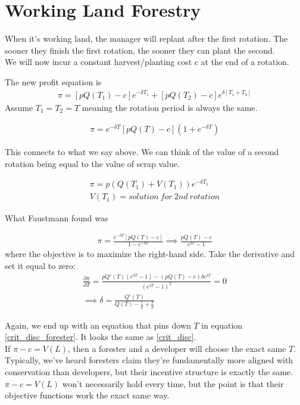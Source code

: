 \documentclass[12pt]{article}
\begin{document}
\section{Working Land Forestry}
When it's working land, the manager will replant after the first rotation. The sooner they finish the first rotation, the sooner they can plant the second. \\

We will now incur a constant  harvest/planting cost $c$ at the end of a rotation. 

The new profit equation is 
\begin{align}
    \pi = [pQ(T_1) - c]e^{-\delta T_1} + [pQ(T_2) - c]e^{\delta [T_1 + T_2]}
\end{align}
Assume $T_1 = T_2 = T$ meaning the rotation period is always the same. 

\begin{align}
    \pi = e^{-\delta T} [pQ(T) - c](1+ e^{-\delta T})
\end{align}

This connects to what we say above. We can think of the value of a second rotation being equal to the value of scrap value. 

\begin{align}
    \pi = p(Q(T_1) + V(T_1))e^{-\delta T_1}\\
    V(T_1) = solution \ for \ 2nd \ rotation
\end{align}

What Faustmann found was 

\begin{align}
    \pi = \frac{e^{-\delta T}[pQ(T) - c]}{1 - e^{-\delta T}} \implies \frac{pQ(T) - c}{e^{\delta T} - 1}
\end{align}
where the objective is to maximize the right-hand side. Take the derivative and set it equal to zero: 
\begin{align}
    \frac{\partial \pi}{\partial T} = \frac{pQ'(T) (e^{\delta T}-1) - (pQ(T) - c)\delta e^{\delta T}}{(e^{\delta T} - 1)^2} = 0 \\
    \implies \delta = \frac{Q'(T)}{Q(T) - \frac{c}{p} + \frac{\pi}{p}} \label{crit_disc_forester}
\end{align}

Again, we end up with an equation that pins down $T$ in equation \ref{crit_disc_forester}. It looks the same as \ref{crit_disc}.\\


If $\pi - c = V(L)$, then a forester and a developer will choose the exact same $T$. Typically, we've heard foresters claim they're fundamentally more aligned with conservation than developers, but their incentive structure is exactly the same. $\pi - c = V(L)$ won't necessarily hold every time, but the point is that their objective functions work the exact same way. \\
\end{document}

